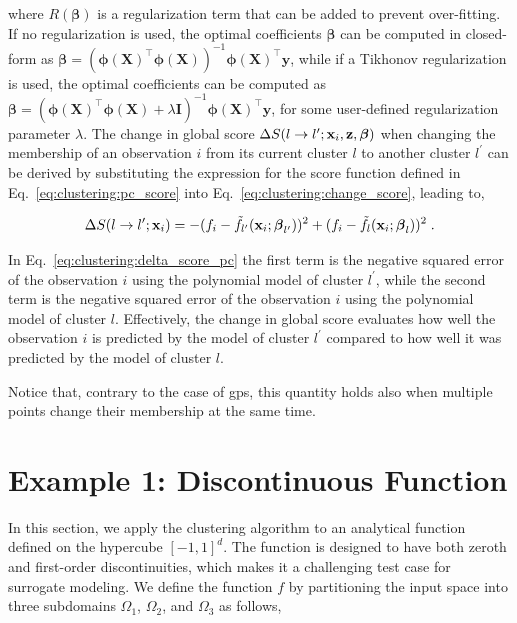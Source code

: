 where $R(\boldsymbol{\beta})$ is a regularization term that can be added to prevent over-fitting. If no regularization is used, the optimal coefficients $\boldsymbol{\beta}$ can be computed in closed-form as $\boldsymbol{\beta} = (\boldsymbol{\phi}(\mathbf{X})^{\top} \boldsymbol{\phi}(\mathbf{X}))^{-1} \boldsymbol{\phi}(\mathbf{X})^{\top} \mathbf{y}$, while if a Tikhonov regularization is used, the optimal coefficients can be computed as $\boldsymbol{\beta} = (\boldsymbol{\phi}(\mathbf{X})^{\top} \boldsymbol{\phi}(\mathbf{X}) + \lambda \mathbf{I})^{-1} \boldsymbol{\phi}(\mathbf{X})^{\top} \mathbf{y}$, for some user-defined regularization parameter $\lambda$. The change in global score $\Delta S (l \rightarrow l^{\prime}; \mathbf{x}_i, \mathbf{z}, \boldsymbol{\beta})$ when changing the membership of an observation $i$ from its current cluster $l$ to another cluster $l^\prime$ can be derived by substituting the expression for the score function defined in Eq.~\eqref{eq:clustering:pc_score} into Eq.~\eqref{eq:clustering:change_score}, leading to,

\begin{equation}
  \Delta S (l \rightarrow l^{\prime}; \mathbf{x}_i) = - (f_i - \tilde{f}_{l^\prime}(\mathbf{x}_i; \boldsymbol{\beta}_{l^\prime}))^2 + (f_i - \tilde{f}_{l}(\mathbf{x}_i; \boldsymbol{\beta}_{l}))^2 \;.
  \label{eq:clustering:delta_score_pc}
\end{equation}

In Eq.~\eqref{eq:clustering:delta_score_pc} the first term is the negative squared error of the observation $i$ using the polynomial model of cluster $l^\prime$, while the second term is the negative squared error of the observation $i$ using the polynomial model of cluster $l$. Effectively, the change in global score evaluates how well the observation $i$ is predicted by the model of cluster $l^\prime$ compared to how well it was predicted by the model of cluster $l$. 

\smallskip
Notice that, contrary to the case of \glspl{gp}, this quantity holds also when multiple points change their membership at the same time.

\section{Example 1: Discontinuous Function}
\label{sc:tc_1}

In this section, we apply the clustering algorithm to an analytical function defined on the hypercube $[-1,1]^d$. The function is designed to have both zeroth and first-order discontinuities, which makes it a challenging test case for surrogate modeling. We define the function $f$ by partitioning the input space into three subdomains $\Omega_1$, $\Omega_2$, and $\Omega_3$ as follows,

